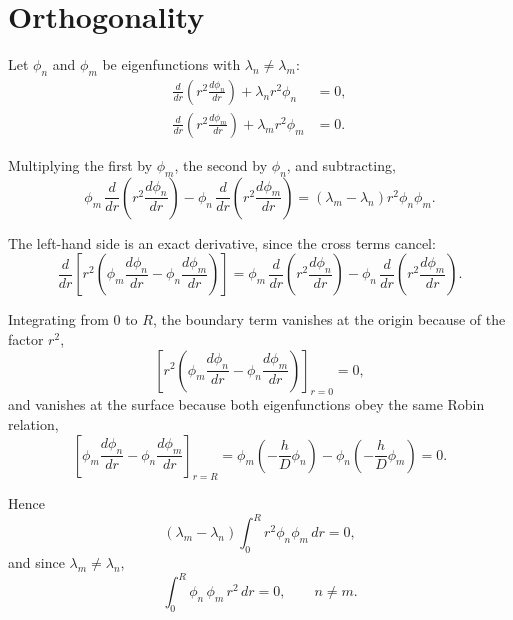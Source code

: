 \documentclass[11pt,a4paper]{article}
\begin{document}
\section{Orthogonality}

Let $\phi_{n}$ and $\phi_{m}$ be eigenfunctions with $\lambda_{n} \neq \lambda_{m}$:
\begin{align}
\frac{d}{dr}\!\left(r^{2}\frac{d\phi_{n}}{dr}\right) + \lambda_{n} r^{2}\phi_{n} &= 0 , \\
\frac{d}{dr}\!\left(r^{2}\frac{d\phi_{m}}{dr}\right) + \lambda_{m} r^{2}\phi_{m} &= 0 .
\end{align}

Multiplying the first by $\phi_{m}$, the second by $\phi_{n}$, and subtracting,
\begin{equation}
\phi_{m}\,\frac{d}{dr}\!\left(r^{2}\frac{d\phi_{n}}{dr}\right)
- \phi_{n}\,\frac{d}{dr}\!\left(r^{2}\frac{d\phi_{m}}{dr}\right)
= \left(\lambda_{m} - \lambda_{n}\right) r^{2}\phi_{n}\phi_{m} .
\end{equation}

The left-hand side is an exact derivative, since the cross terms cancel:
\begin{equation}
\frac{d}{dr}\!\left[r^{2}\!\left(\phi_{m}\frac{d\phi_{n}}{dr}
- \phi_{n}\frac{d\phi_{m}}{dr}\right)\right]
= \phi_{m}\,\frac{d}{dr}\!\left(r^{2}\frac{d\phi_{n}}{dr}\right)
- \phi_{n}\,\frac{d}{dr}\!\left(r^{2}\frac{d\phi_{m}}{dr}\right) .
\end{equation}

Integrating from $0$ to $R$, the boundary term vanishes at the origin because of the
factor $r^{2}$,
\begin{equation}
\left[r^{2}\!\left(\phi_{m}\frac{d\phi_{n}}{dr}
- \phi_{n}\frac{d\phi_{m}}{dr}\right)\right]_{r=0} = 0 ,
\end{equation}
and vanishes at the surface because both eigenfunctions obey the same Robin
relation,
\begin{equation}
\left[\phi_{m}\frac{d\phi_{n}}{dr} - \phi_{n}\frac{d\phi_{m}}{dr}\right]_{r=R}
= \phi_{m}\left(-\frac{h}{D}\phi_{n}\right)
- \phi_{n}\left(-\frac{h}{D}\phi_{m}\right) = 0 .
\end{equation}

Hence
\begin{equation}
\left(\lambda_{m} - \lambda_{n}\right)\int_{0}^{R} r^{2}\phi_{n}\phi_{m}\,dr = 0 ,
\end{equation}
and since $\lambda_{m} \neq \lambda_{n}$,
\begin{equation}
\boxed{\;
\int_{0}^{R} \phi_{n}\,\phi_{m}\, r^{2}\,dr = 0 ,
\qquad n \neq m .
\;}
\label{eq:orthog}
\end{equation}
\end{document}
